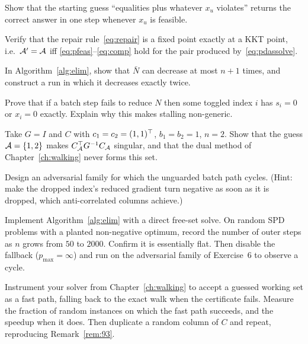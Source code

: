 \begin{exercises}

\begin{exercise}
Show that the starting guess ``equalities plus whatever $x_u$ violates'' returns the
correct answer in one step whenever $x_u$ is feasible.
\end{exercise}

\begin{exercise}
Verify that the repair rule~\eqref{eq:repair} is a fixed point exactly at a KKT
point, i.e.\ $\mathcal{A}' = \mathcal{A}$ iff \eqref{eq:pfeas}--\eqref{eq:comp} hold for the
pair produced by~\eqref{eq:pdassolve}.
\end{exercise}

\begin{exercise}
In Algorithm~\ref{alg:elim}, show that $\bar N$ can decrease at most $n+1$ times,
and construct a run in which it decreases exactly twice.
\end{exercise}

\begin{exercise}
Prove that if a batch step fails to reduce $N$ then some toggled index $i$ has
$s_i = 0$ or $x_i = 0$ exactly. Explain why this makes stalling non-generic.
\end{exercise}

\begin{exercise}
Take $G = I$ and $C$ with $c_1 = c_2 = (1,1)^{\top}$, $b_1 = b_2 = 1$, $n = 2$. Show that
the guess $\mathcal{A} = \{1,2\}$ makes $C_{\mathcal{A}}^{\top} G^{-1} C_{\mathcal{A}}$ singular, and that
the dual method of Chapter~\ref{ch:walking} never forms this set.
\end{exercise}

\begin{exercise}
Design an adversarial family for which the unguarded batch path cycles. (Hint: make
the dropped index's reduced gradient turn negative as soon as it is dropped, which
anti-correlated columns achieve.)
\end{exercise}

\begin{exercise}[Implementation]
Implement Algorithm~\ref{alg:elim} with a direct free-set solve. On random SPD
problems with a planted non-negative optimum, record the number of outer steps as
$n$ grows from $50$ to $2000$. Confirm it is essentially flat. Then disable the
fallback ($p_{\max} = \infty$) and run on the adversarial family of Exercise~6 to
observe a cycle.
\end{exercise}

\begin{exercise}[Implementation]
Instrument your solver from Chapter~\ref{ch:walking} to accept a guessed working set
as a fast path, falling back to the exact walk when the certificate fails. Measure
the fraction of random instances on which the fast path succeeds, and the speedup
when it does. Then duplicate a random column of $C$ and repeat, reproducing
Remark~\ref{rem:93}.
\end{exercise}

\end{exercises}

